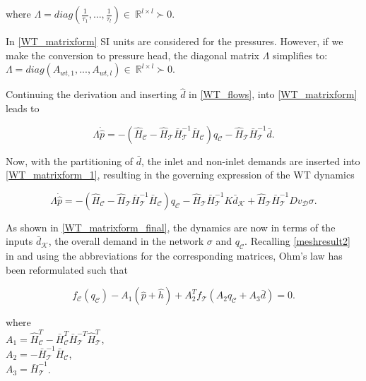 where $\Lambda = diag(\frac{1}{\tau_1},... ,\frac{1}{\tau_l}) \in \: \mathbb{R}^{l \times l} \succ 0$. 

In \eqref{WT_matrixform} SI units are considered for the pressures. However, if we make the conversion to pressure head, the diagonal matrix $\Lambda$ simplifies to:
$\Lambda = diag(A_{wt,1},... ,A_{wt,l}) \in \: \mathbb{R}^{l \times l} \succ 0$. 

Continuing the derivation and inserting $\hat{d}$ in \eqref{WT_flows}, into \eqref{WT_matrixform} leads to

\begin{equation}
\label{WT_matrixform_1}
\Lambda \dot{\hat{p}} = - (\hat{H}_{\mathcal{C}} - \hat{H}_{\mathcal{T}} \bar{H}^{-1}_{\mathcal{T}}\bar{H}_{\mathcal{C}})  q_\mathcal{C}  - \hat{H}_{\mathcal{T}} \bar{H}^{-1}_{\mathcal{T}} \bar{d}.
\end{equation}

Now, with the partitioning of $\bar{d}$, the inlet and non-inlet demands are inserted into \eqref{WT_matrixform_1}, resulting in the governing expression of the WT dynamics

\begin{equation}
\label{WT_matrixform_final}
\Lambda \dot{\hat{p}} = - (\hat{H}_{\mathcal{C}} - \hat{H}_{\mathcal{T}} \bar{H}^{-1}_{\mathcal{T}}\bar{H}_{\mathcal{C}})  q_\mathcal{C}  - \hat{H}_{\mathcal{T}} \bar{H}^{-1}_{\mathcal{T}} K \bar{d}_{\mathcal{K}} + \hat{H}_{\mathcal{T}} \bar{H}^{-1}_{\mathcal{T}} D v_{\mathcal{D}} \sigma .
\end{equation}

As shown in \eqref{WT_matrixform_final}, the dynamics are now in terms of the inputs $\bar{d}_{\mathcal{K}}$, the overall demand in the network $\sigma$ and $q_\mathcal{C}$. Recalling \eqref{meshresult2} in  and using the abbreviations for the corresponding matrices, Ohm's law has been reformulated such that

 \begin{equation}
\label{meshresult2_WT_model}
f_{\mathcal{C}}(q_\mathcal{C}) -A_1(\hat{p} + \hat{h}) + A_2^T f_{\mathcal{T}}(A_2 q_\mathcal{C} + A_3 \bar{d}) = 0.
\end{equation} 

\begin{minipage}[t]{0.4\textwidth}
where\\
\hspace*{8mm} $A_1 = \hat{H}^T_{\mathcal{C}} -\bar{H}^T_{\mathcal{C}}\bar{H}^{-T}_{\mathcal{T}}\hat{H}^T_{\mathcal{T}}$, \vspace*{1.5mm}  \\
\hspace*{8mm} $A_2 = -\bar{H}^{-1}_{\mathcal{T}} \bar{H}_{\mathcal{C}} $, \vspace*{1.5mm}\\
\hspace*{8mm} $A_3 = \bar{H}^{-1}_{\mathcal{T}}$. 
\end{minipage}

